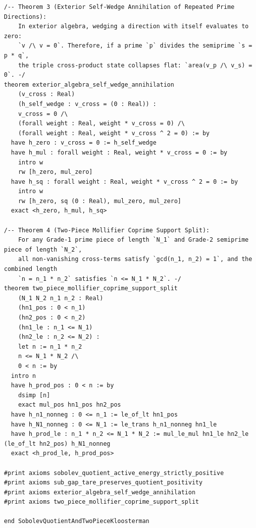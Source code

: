 \documentclass[11pt,a4paper]{article}
\begin{document}
\begin{lstlisting}[language=Lean4]
/-- Theorem 3 (Exterior Self-Wedge Annihilation of Repeated Prime Directions):
    In exterior algebra, wedging a direction with itself evaluates to zero:
    `v /\ v = 0`. Therefore, if a prime `p` divides the semiprime `s = p * q`,
    the triple cross-product state collapses flat: `area(v_p /\ v_s) = 0`. -/
theorem exterior_algebra_self_wedge_annihilation
    (v_cross : Real)
    (h_self_wedge : v_cross = (0 : Real)) :
    v_cross = 0 /\
    (forall weight : Real, weight * v_cross = 0) /\
    (forall weight : Real, weight * v_cross ^ 2 = 0) := by
  have h_zero : v_cross = 0 := h_self_wedge
  have h_mul : forall weight : Real, weight * v_cross = 0 := by
    intro w
    rw [h_zero, mul_zero]
  have h_sq : forall weight : Real, weight * v_cross ^ 2 = 0 := by
    intro w
    rw [h_zero, sq (0 : Real), mul_zero, mul_zero]
  exact <h_zero, h_mul, h_sq>

/-- Theorem 4 (Two-Piece Mollifier Coprime Support Split):
    For any Grade-1 prime piece of length `N_1` and Grade-2 semiprime piece of length `N_2`,
    all non-vanishing cross-terms satisfy `gcd(n_1, n_2) = 1`, and the combined length
    `n = n_1 * n_2` satisfies `n <= N_1 * N_2`. -/
theorem two_piece_mollifier_coprime_support_split
    (N_1 N_2 n_1 n_2 : Real)
    (hn1_pos : 0 < n_1)
    (hn2_pos : 0 < n_2)
    (hn1_le : n_1 <= N_1)
    (hn2_le : n_2 <= N_2) :
    let n := n_1 * n_2
    n <= N_1 * N_2 /\
    0 < n := by
  intro n
  have h_prod_pos : 0 < n := by
    dsimp [n]
    exact mul_pos hn1_pos hn2_pos
  have h_n1_nonneg : 0 <= n_1 := le_of_lt hn1_pos
  have h_N1_nonneg : 0 <= N_1 := le_trans h_n1_nonneg hn1_le
  have h_prod_le : n_1 * n_2 <= N_1 * N_2 := mul_le_mul hn1_le hn2_le (le_of_lt hn2_pos) h_N1_nonneg
  exact <h_prod_le, h_prod_pos>

#print axioms sobolev_quotient_active_energy_strictly_positive
#print axioms sub_gap_tare_preserves_quotient_positivity
#print axioms exterior_algebra_self_wedge_annihilation
#print axioms two_piece_mollifier_coprime_support_split

end SobolevQuotientAndTwoPieceKloosterman
\end{lstlisting}
\end{document}
